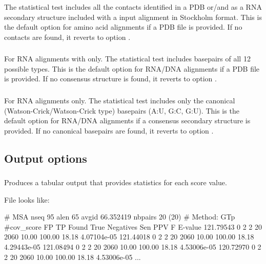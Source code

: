 \subsubsection{}
The statistical test includes all the contacts identified in a PDB
or/and as a RNA secondary structure included with a input alignment in
Stockholm format.  This is the default option for amino acid
alignments if a PDB file is provided.  If no contacts are found, it
reverts to option .

\subsubsection{} For RNA alignments with only.
The statistical test includes basepairs of all 12 possible types.
This is the default option for RNA/DNA alignments if a PDB file is
provided.  If no consensus structure is found, it reverts to
option .

\subsubsection{} For RNA alignments only.
The statistical test includes only the canonical
(Watson-Crick/Watson-Crick type) basepairs (A:U, G:C, G:U).  This is
the default option for RNA/DNA alignments if a consensus secondary
structure is provided. If no canonical basepairs are found, it reverts
to option .

\subsection{Output options}

\subsubsection{}

Produces a tabular output that provides statistics for each score value.

File  looks like:

\begin{sreoutput}
# MSA nseq 95 alen 65 avgid 66.352419 nbpairs 20 (20)
# Method: GTp
#cov_score  FP  TP Found  True  Negatives  Sen   PPV     F       E-value
121.79543   0   2  2      20    2060       10.00 100.00  18.18   4.07104e-05
121.44018   0   2  2      20    2060       10.00 100.00  18.18   4.29443e-05
121.08494   0   2  2      20    2060       10.00 100.00  18.18   4.53006e-05
120.72970   0   2  2      20    2060       10.00 100.00  18.18   4.53006e-05
...
\end{sreoutput}

